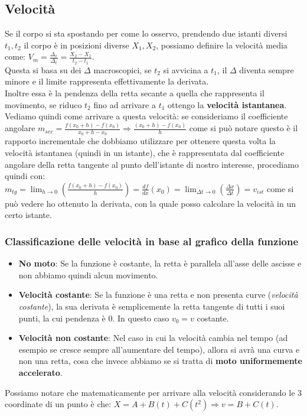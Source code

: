 \documentclass[a4paper,12pt]{report}
\begin{document}
	\subsection{Velocità}
	Se il corpo si sta spostando per come lo osservo, prendendo due istanti diversi ${t_1,t_2}$ il corpo è in posizioni diverse ${X_1,X_2}$, possiamo definire la velocità media come: ${V_m = \frac{\Delta_x}{\Delta_t} = \frac{X_2 - X_1}{t_2 - t_1}}$.\\
	Questa si basa su dei ${\Delta}$ macroscopici, se ${t_2}$ si avvicina a ${t_1}$, il ${\Delta}$ diventa sempre minore e il limite rappresenta effettivamente la derivata.\\
	Inoltre essa è la pendenza della retta secante a quella che rappresenta il movimento, se riduco $t_2$ fino ad arrivare a $t_1$ ottengo la \textbf{velocità istantanea}.\\
	Vediamo quindi come arrivare a questa velocità: se consideriamo il coefficiente angolare $m_{sec} = {{\frac{f(x_0 + h) - f(x_0)}{x_0 + h - x_0}} \Rightarrow {\frac{(x_0 + h) - f(x_0)}{h}}}$ come si può notare questo è il rapporto incrementale che dobbiamo utilizzare per ottenere questa volta la velocità istantanea (quindi in un istante), che è rappresentata dal coefficiente angolare della retta tangente al punto dell'istante di nostro interesse, procediamo quindi con: $m_{tg} = {\lim_{h\to0}(\frac{f(x_0 + h) - f(x_0)}{h})} = {\frac{df}{dx}(x_0)} = {\lim_{\Delta t\to0}(\frac{\Delta x}{\Delta t})} = v_{ist}$ come si può vedere ho ottenuto la derivata, con la quale posso calcolare la velocità in un certo istante.
	\subsubsection{Classificazione delle velocità in base al grafico della funzione}
	\begin{itemize}
		\item \textbf{No moto}: Se la funzione è costante, la retta è parallela all'asse delle ascisse e non abbiamo quindi alcun movimento.
		\item \textbf{Velocità costante}: Se la funzione è una retta e non presenta curve (\textit{velocità costante}), la sua derivata è semplicemente la retta tangente di tutti i suoi punti, la cui pendenza è 0. In questo caso ${v_0 = v}$ costante.
		\item \textbf{Velocità non costante}: Nel caso in cui la velocità cambia nel tempo (ad esempio se cresce sempre all'aumentare del tempo), allora si avrà una curva e non una retta, cosa che invece abbiamo se si tratta di \textbf{moto uniformemente accelerato}.
	\end{itemize}
	Possiamo notare che matematicamente per arrivare alla velocità considerando le 3 coordinate di un punto è che: ${{X = A + B(t) + C(t^2)} \Rightarrow {v = B + C(t)}}$.
\end{document}
